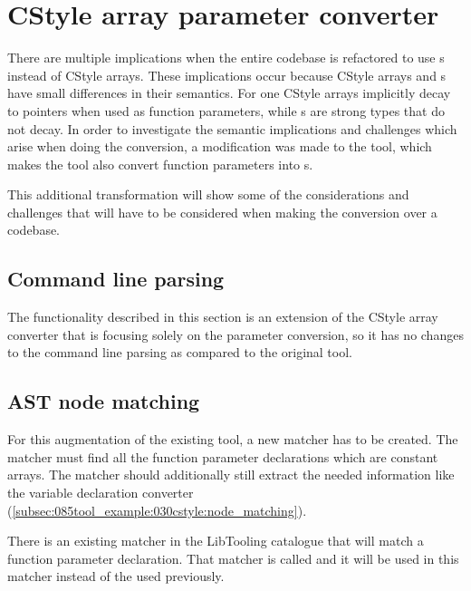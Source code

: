 
\section{CStyle array parameter converter} \label{sec:080:035:cstyleArrayParm}

There are multiple implications when the entire codebase is refactored to use s instead of CStyle arrays. These implications occur because CStyle arrays and s have small differences in their semantics.
For one CStyle arrays implicitly decay to pointers when used as function parameters, while s are strong types that do not decay. In order to investigate the semantic implications and challenges which arise when doing the conversion, a modification was made to the tool, which makes the tool also convert function parameters into s.

This additional transformation will show some of the considerations and challenges that will have to be considered when making the conversion over a codebase.

\subsection{Command line parsing}

The functionality described in this section is an extension of the CStyle array converter that is focusing solely on the parameter conversion, so it has no changes to the command line parsing as compared to the original tool.

\subsection{AST node matching}

For this augmentation of the existing tool, a new matcher has to be created. The matcher must find all the function parameter declarations which are constant arrays. The matcher should additionally still extract the needed information like the variable declaration converter (\cref{subsec:085tool_example:030cstyle:node_matching}).

There is an existing matcher in the LibTooling catalogue that will match a function parameter declaration. That matcher is called  and it will be used in this matcher instead of the  used previously.


